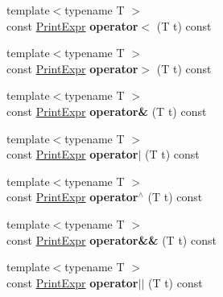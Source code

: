 \begin{DoxyCompactItemize}
\item 
\hypertarget{classPrintExpr_a4f03b46ac75405bac225bd7e94f1b385}{{\footnotesize template$<$typename T $>$ }\\const \hyperlink{classPrintExpr}{Print\-Expr} {\bfseries operator$<$} (T t) const }\label{classPrintExpr_a4f03b46ac75405bac225bd7e94f1b385}

\item 
\hypertarget{classPrintExpr_ad6bb35a1f423a7b3caea89bb0431ccaa}{{\footnotesize template$<$typename T $>$ }\\const \hyperlink{classPrintExpr}{Print\-Expr} {\bfseries operator$>$} (T t) const }\label{classPrintExpr_ad6bb35a1f423a7b3caea89bb0431ccaa}

\item 
\hypertarget{classPrintExpr_ad2e19bfd7468ffe5468d8bbad69a8d64}{{\footnotesize template$<$typename T $>$ }\\const \hyperlink{classPrintExpr}{Print\-Expr} {\bfseries operator\&} (T t) const }\label{classPrintExpr_ad2e19bfd7468ffe5468d8bbad69a8d64}

\item 
\hypertarget{classPrintExpr_a72477ad88cddc59f21912daf715c9063}{{\footnotesize template$<$typename T $>$ }\\const \hyperlink{classPrintExpr}{Print\-Expr} {\bfseries operator$\vert$} (T t) const }\label{classPrintExpr_a72477ad88cddc59f21912daf715c9063}

\item 
\hypertarget{classPrintExpr_ad4e4e7e028705d9414c5baed97b5ba8f}{{\footnotesize template$<$typename T $>$ }\\const \hyperlink{classPrintExpr}{Print\-Expr} {\bfseries operator$^\wedge$} (T t) const }\label{classPrintExpr_ad4e4e7e028705d9414c5baed97b5ba8f}

\item 
\hypertarget{classPrintExpr_a7f8a898d80f69ade2f6ccbbfd8bcdab9}{{\footnotesize template$<$typename T $>$ }\\const \hyperlink{classPrintExpr}{Print\-Expr} {\bfseries operator\&\&} (T t) const }\label{classPrintExpr_a7f8a898d80f69ade2f6ccbbfd8bcdab9}

\item 
\hypertarget{classPrintExpr_a5a4633ab68787949747c9ca2e7eb0494}{{\footnotesize template$<$typename T $>$ }\\const \hyperlink{classPrintExpr}{Print\-Expr} {\bfseries operator$\vert$$\vert$} (T t) const }\label{classPrintExpr_a5a4633ab68787949747c9ca2e7eb0494}


\end{DoxyCompactItemize}

